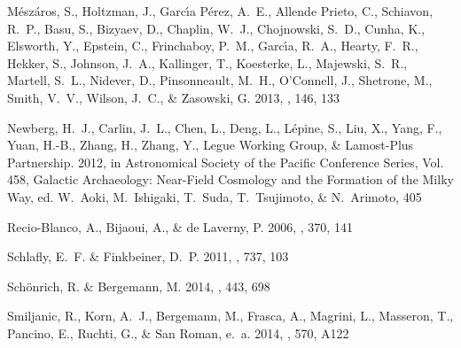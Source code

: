 \documentclass[12pt, preprint]{aastex}
\begin{document}
\begin{thebibliography}{24}
{M{\'e}sz{\'a}ros}, S., {Holtzman}, J., {Garc{\'{\i}}a P{\'e}rez}, A.~E.,
  {Allende Prieto}, C., {Schiavon}, R.~P., {Basu}, S., {Bizyaev}, D.,
  {Chaplin}, W.~J., {Chojnowski}, S.~D., {Cunha}, K., {Elsworth}, Y.,
  {Epstein}, C., {Frinchaboy}, P.~M., {Garc{\'{\i}}a}, R.~A., {Hearty}, F.~R.,
  {Hekker}, S., {Johnson}, J.~A., {Kallinger}, T., {Koesterke}, L., {Majewski},
  S.~R., {Martell}, S.~L., {Nidever}, D., {Pinsonneault}, M.~H., {O'Connell},
  J., {Shetrone}, M., {Smith}, V.~V., {Wilson}, J.~C., \& {Zasowski}, G. 2013,
  \aj, 146, 133

{Newberg}, H.~J., {Carlin}, J.~L., {Chen}, L., {Deng}, L., {L{\'e}pine}, S.,
  {Liu}, X., {Yang}, F., {Yuan}, H.-B., {Zhang}, H., {Zhang}, Y., {Legue
  Working Group}, \& {Lamost-Plus Partnership}. 2012, in Astronomical Society
  of the Pacific Conference Series, Vol. 458, Galactic Archaeology: Near-Field
  Cosmology and the Formation of the Milky Way, ed. W.~{Aoki}, M.~{Ishigaki},
  T.~{Suda}, T.~{Tsujimoto}, \& N.~{Arimoto}, 405

{Recio-Blanco}, A., {Bijaoui}, A., \& {de Laverny}, P. 2006, \mnras, 370, 141

{Schlafly}, E.~F. \& {Finkbeiner}, D.~P. 2011, \apj, 737, 103

{Sch{\"o}nrich}, R. \& {Bergemann}, M. 2014, \mnras, 443, 698

{Smiljanic}, R., {Korn}, A.~J., {Bergemann}, M., {Frasca}, A., {Magrini}, L.,
  {Masseron}, T., {Pancino}, E., {Ruchti}, G., \& {San Roman}, e.~a. 2014,
  \aap, 570, A122



\end{thebibliography}
\end{document}
